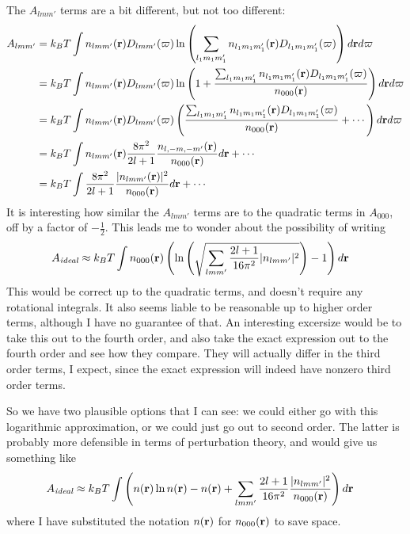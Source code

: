 \documentclass[letterpaper,twocolumn,amsmath,amssymb,pre]{revtex4-1}
\begin{document}
The $A_{lmm'}$ terms are a bit different, but not too different:
\begin{align}
  A_{lmm'} &=
  k_BT \int n_{lmm'}(\mathbf{r}) D_{lmm'}(\mathbf{\varpi})
  \ln\left(\sum_{l_1m_1m'_1} n_{l_1m_1m'_1}(\mathbf{r})
  D_{l_1m_1m'_1}(\mathbf{\varpi})\right)
  d\mathbf{r} d\mathbf{\varpi}
  \\
  &=
  k_BT \int n_{lmm'}(\mathbf{r}) D_{lmm'}(\mathbf{\varpi})
  \ln\left(1 + \frac{\sum_{l_1m_1m'_1} n_{l_1m_1m'_1}(\mathbf{r})
  D_{l_1m_1m'_1}(\mathbf{\varpi})}{n_{000}(\mathbf{r})}\right)
  d\mathbf{r} d\mathbf{\varpi}
  \\
  &=
  k_BT \int n_{lmm'}(\mathbf{r}) D_{lmm'}(\mathbf{\varpi})
  \left(\frac{\sum_{l_1m_1m'_1} n_{l_1m_1m'_1}(\mathbf{r})
  D_{l_1m_1m'_1}(\mathbf{\varpi})}{n_{000}(\mathbf{r})}+\cdots\right)
  d\mathbf{r} d\mathbf{\varpi}
  \\
  &=
  k_BT \int n_{lmm'}(\mathbf{r}) \frac{8\pi^2}{2l+1} \frac{n_{l,-m,-m'}(\mathbf{r})}{n_{000}(\mathbf{r})}
  d\mathbf{r} + \cdots
  \\
  &=
  k_BT \int \frac{8\pi^2}{2l+1} \frac{|n_{lmm'}(\mathbf{r})|^2}{n_{000}(\mathbf{r})}
  d\mathbf{r} + \cdots
\end{align}
It is interesting how similar the $A_{lmm'}$ terms are to the
quadratic terms in $A_{000}$, off by a factor of $-\frac12$.  This
leads me to wonder about the possibility of writing
\begin{align}
  A_{\textit{ideal}} &\approx
  k_BT \int n_{000}(\mathbf{r})\left( \ln\left(
  \sqrt{\sum_{lmm'}\frac{2l+1}{16\pi^2}|n_{lmm'}|^2}
  \right) - 1\right)d\mathbf{r}
\end{align}
This would be correct up to the quadratic terms, and doesn't require
any rotational integrals.  It also seems liable to be reasonable up to
higher order terms, although I have no guarantee of that.  An
interesting excersize would be to take this out to the fourth order,
and also take the exact expression out to the fourth order and see how
they compare.  They will actually differ in the third order terms, I
expect, since the exact expression will indeed have nonzero third
order terms.

So we have two plausible options that I can see: we could either go
with this logarithmic approximation, or we could just go out to second
order.  The latter is probably more defensible in terms of
perturbation theory, and would give us something like
\begin{align}
  A_{\textit{ideal}} &\approx
  k_BT \int \left(n(\mathbf{r})\ln n(\mathbf{r}) - n(\mathbf{r}) +
  \sum_{lmm'}\frac{2l+1}{16\pi^2}\frac{|n_{lmm'}|^2}{n_{000}(\mathbf{r})}
  \right)d\mathbf{r}
\end{align}
where I have substituted the notation $n(\mathbf{r})$ for $n_{000}(\mathbf{r})$ to
save space.
\end{document}
